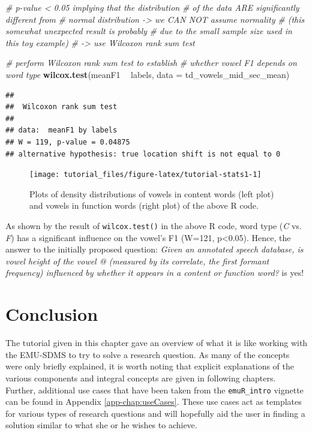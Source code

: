 \documentclass[]{book}
\newenvironment{Shaded}{\begin{snugshade}}{\end{snugshade}}
\newcommand{\CommentTok}[1]{\textcolor[rgb]{0.56,0.35,0.01}{\textit{#1}}}
\newcommand{\DataTypeTok}[1]{\textcolor[rgb]{0.13,0.29,0.53}{#1}}
\newcommand{\KeywordTok}[1]{\textcolor[rgb]{0.13,0.29,0.53}{\textbf{#1}}}
\newcommand{\NormalTok}[1]{#1}
\newcommand{\OperatorTok}[1]{\textcolor[rgb]{0.81,0.36,0.00}{\textbf{#1}}}
\newcommand{\StringTok}[1]{\textcolor[rgb]{0.31,0.60,0.02}{#1}}
\begin{document}
\begin{Shaded}
\begin{Highlighting}[]
\CommentTok{# p-value < 0.05 implying that the distribution}
\CommentTok{# of the data ARE significantly different from}
\CommentTok{# normal distribution -> we CAN NOT assume normality}
\CommentTok{# (this somewhat unexpected result is probably}
\CommentTok{# due to the small sample size used in this toy example)}
\CommentTok{# -> use Wilcoxon rank sum test}

\CommentTok{# perform Wilcoxon rank sum test to establish}
\CommentTok{# whether vowel F1 depends on word type}
\KeywordTok{wilcox.test}\NormalTok{(meanF1 }\OperatorTok{~}\StringTok{ }\NormalTok{labels, }\DataTypeTok{data =}\NormalTok{ td_vowels_mid_sec_mean)}
\end{Highlighting}
\end{Shaded}

\begin{verbatim}
## 
##  Wilcoxon rank sum test
## 
## data:  meanF1 by labels
## W = 119, p-value = 0.04875
## alternative hypothesis: true location shift is not equal to 0
\end{verbatim}

\begin{figure}

{\centering \texttt{[image: tutorial\_files/figure-latex/tutorial-stats1-1]} 

}

\caption{Plots of density distributions of vowels in content words (left plot) and vowels in function words (right plot) of the above R code.}\label{fig:tutorial-stats1}
\end{figure}

As shown by the result of \texttt{wilcox.test()} in the above R code, word type (\emph{C} vs. \emph{F}) has a significant influence on the vowel's F1 (W=121, p\textless{}0.05). Hence, the answer to the initially proposed question: \emph{Given an annotated speech database, is vowel height of the vowel @ (measured by its correlate, the first formant frequency) influenced by whether it appears in a content or function word?} is yes!

\hypertarget{conclusion}{%
\section{Conclusion}\label{conclusion}}

The tutorial given in this chapter gave an overview of what it is like working with the EMU-SDMS to try to solve a research question. As many of the concepts were only briefly explained, it is worth noting that explicit explanations of the various components and integral concepts are given in following chapters. Further, additional use cases that have been taken from the \texttt{emuR\_intro} vignette can be found in Appendix \ref{app-chap:useCases}. These use cases act as templates for various types of research questions and will hopefully aid the user in finding a solution similar to what she or he wishes to achieve.
\end{document}
